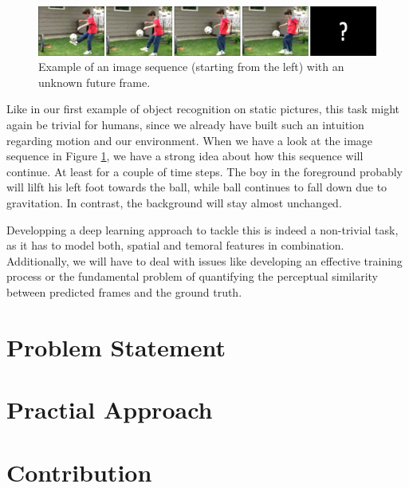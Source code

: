\begin{figure}[htpb]
	\centering
	\includegraphics[width=1.0\linewidth]{figures/ucf-intro/serie1.png} 
	\caption[Example: Image sequence]{Example of an image sequence (starting from the left) with an unknown future frame.} \label{fig:intro-seq}
\end{figure}

Like in our first example of object recognition on static pictures, this task might again be trivial for humans, since we already have built such an intuition regarding motion and our environment. When we have a look at the image sequence in Figure \ref{fig:intro-seq}, we have a strong idea about how this sequence will continue. At least for a couple of time steps. The boy in the foreground probably will lilft his left foot towards the ball, while ball continues to fall down due to gravitation. In contrast, the background will stay almost unchanged.

Developping a deep learning approach to tackle this is indeed a non-trivial task, as it has to model both, spatial and temoral features in combination. Additionally, we will have to deal with issues like developing an effective training process or the fundamental problem of quantifying the perceptual similarity between predicted frames and the ground truth.

\section{Problem Statement}

\section{Practial Approach} %
% 

\section{Contribution}

